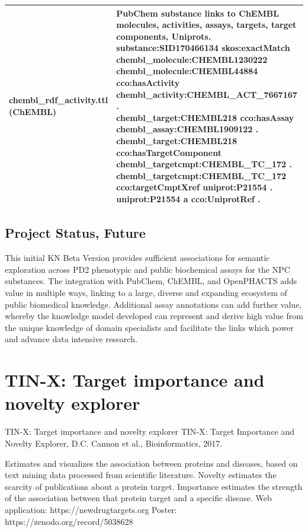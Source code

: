 \begin{table}[]
\begin{tabular}{p{0.3\linewidth}p{0.7\linewidth}}
chembl\_rdf\_activity.ttl (ChEMBL) & \makecell{PubChem substance links to ChEMBL molecules, activities, assays, targets, target components, Uniprots. \\ substance:SID170466134 skos:exactMatch chembl\_molecule:CHEMBL1230222 \\ chembl\_molecule:CHEMBL44884 cco:hasActivity chembl\_activity:CHEMBL\_ACT\_7667167 . \\ chembl\_target:CHEMBL218 cco:hasAssay chembl\_assay:CHEMBL1909122 . \\ chembl\_target:CHEMBL218 cco:hasTargetComponent chembl\_targetcmpt:CHEMBL\_TC\_172 . \\ chembl\_targetcmpt:CHEMBL\_TC\_172 cco:targetCmptXref uniprot:P21554 . \\ uniprot:P21554 a cco:UniprotRef . } \\
\hline
\end{tabular}
\end{table}


\subsection{Project Status, Future}

This initial KN Beta Version provides sufficient associations for semantic exploration across PD2 phenotypic and public biochemical assays for the NPC substances.  The integration with PubChem, ChEMBL, and OpenPHACTS adds value in multiple ways, linking to a large, diverse and expanding ecosystem of public biomedical knowledge.  Additional assay annotations can add further value, whereby the knowledge model developed can represent and derive high value from the unique knowledge of domain specialists and facilitate the links which power and advance data intensive research.



\section{TIN-X: Target importance and novelty explorer}

TIN-X: Target importance and novelty explorer
TIN-X: Target Importance and Novelty Explorer, D.C. Cannon et al., Bioinformatics, 2017\cite{Cannon2017-af}.

Estimates and visualizes the association between proteins and diseases, based on text mining data processed from scientific literature.  Novelty estimates the scarcity of publications about a protein target. Importance estimates the strength of the association between that protein target and a specific disease.
Web application: https://newdrugtargets.org
Poster: https://zenodo.org/record/5038628

